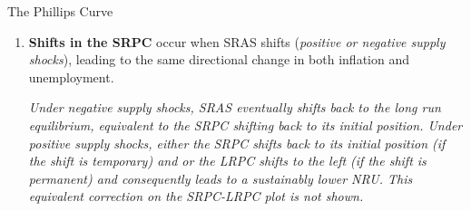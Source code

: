 \documentclass[10pt]{article}
\begin{document}
\begin{core}{The Phillips Curve}
\begin{enumerate}
{\begin{axis}


          \end{axis}
        }{
          \begin{axis}

            \node[circle, fill=black, inner sep=2pt] at (axis cs:2,8) {};

            \draw[dashed] (axis cs:2,8) -- (axis cs:2,0);

            \draw[dashed] (axis cs:2,8) -- (axis cs:0,8); 

             (axis cs:4.5,6.5) -- (axis cs:2.5,8.5);



          \end{axis} 
        }{Movements along the SRPC when AD shifts left (\textit{left; demand decreases}) and right (\textit{right; demand increases})}{fig:ad_srpc}{0.85}

        \item \textbf{Shifts in the SRPC} occur when SRAS shifts (\textit{positive or negative supply shocks}), leading to the same directional change in both inflation and unemployment.

        \textit{Under negative supply shocks, SRAS eventually shifts back to the long run equilibrium, equivalent to the SRPC shifting back to its initial position. Under positive supply shocks, either the SRPC shifts back to its initial position (if the shift is temporary) and or the LRPC shifts to the left (if the shift is permanent) and consequently leads to a sustainably lower NRU. This equivalent correction on the SRPC-LRPC plot is not shown.}

\end{enumerate}
\end{core}
\end{document}
